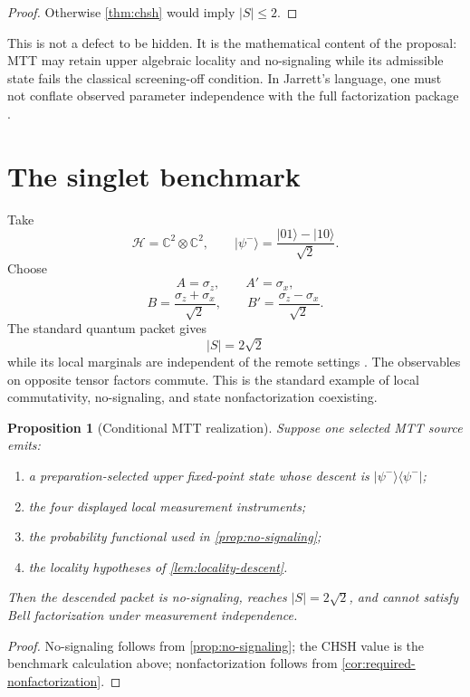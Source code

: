 \documentclass[11pt]{article}
\newcommand{\C}{\mathbb{C}}
\newcommand{\cH}{\mathcal{H}}
\newtheorem{proposition}[theorem]{Proposition}
\theoremstyle{remark}
\begin{document}
\begin{proof}
Otherwise \cref{thm:chsh} would imply $|S|\leq2$.
\end{proof}

This is not a defect to be hidden.  It is the mathematical content of the
proposal: MTT may retain upper algebraic locality and no-signaling while its
admissible state fails the classical screening-off condition.  In Jarrett's
language, one must not conflate observed parameter independence with the full
factorization package \cite{Jarrett1984,Fine1982}.

\section{The singlet benchmark}
\label{sec:benchmark}

Take
\[
 \cH=\C^2\otimes\C^2,
\qquad
 |\psi^-\rangle
 =
 \frac{|01\rangle-|10\rangle}{\sqrt2}.
\]
Choose
\[
 A=\sigma_z,\qquad A'=\sigma_x,
\]
\[
 B=\frac{\sigma_z+\sigma_x}{\sqrt2},
\qquad
 B'=\frac{\sigma_z-\sigma_x}{\sqrt2}.
\]
The standard quantum packet gives
\[
 |S|=2\sqrt2
\]
while its local marginals are independent of the remote settings
\cite{Tsirelson1980}.  The observables on opposite tensor factors commute.
This is the standard example of local commutativity, no-signaling, and state
nonfactorization coexisting.

\begin{proposition}[Conditional MTT realization]
\label{prop:conditional-realization}
Suppose one selected MTT source emits:

\begin{enumerate}[label=(\alph*)]
\item a preparation-selected upper fixed-point state whose descent is
$|\psi^-\rangle\langle\psi^-|$;
\item the four displayed local measurement instruments;
\item the probability functional used in
\cref{prop:no-signaling};
\item the locality hypotheses of \cref{lem:locality-descent}.
\end{enumerate}

Then the descended packet is no-signaling, reaches
$|S|=2\sqrt2$, and cannot satisfy Bell factorization under measurement
independence.
\end{proposition}

\begin{proof}
No-signaling follows from \cref{prop:no-signaling}; the CHSH value is the
benchmark calculation above; nonfactorization follows from
\cref{cor:required-nonfactorization}.
\end{proof}
\end{document}
